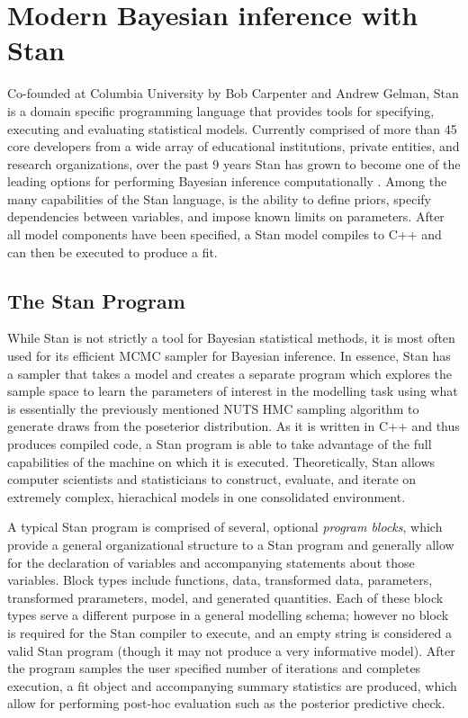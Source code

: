 \documentclass[
  12pt,
]{book}
\theoremstyle{definition}
\theoremstyle{definition}
\theoremstyle{definition}
\theoremstyle{remark}
\begin{document}
\hypertarget{modern-bayesian-inference-with-stan}{%
\chapter{Modern Bayesian inference with Stan}\label{modern-bayesian-inference-with-stan}}

Co-founded at Columbia University by Bob Carpenter and Andrew Gelman, Stan is a domain specific programming language that provides tools for specifying, executing and evaluating statistical models.
Currently comprised of more than 45 core developers from a wide array of educational institutions, private entities, and research organizations, over the past 9 years Stan has grown to become one of the leading options for performing Bayesian inference computationally \citep{Stan2021}.
Among the many capabilities of the Stan language, is the ability to define priors, specify dependencies between variables, and impose known limits on parameters.
After all model components have been specified, a Stan model compiles to C++ and can then be executed to produce a fit.

\hypertarget{the-stan-program}{%
\section{The Stan Program}\label{the-stan-program}}

While Stan is not strictly a tool for Bayesian statistical methods, it is most often used for its efficient MCMC sampler for Bayesian inference.
In essence, Stan has a sampler that takes a model and creates a separate program which explores the sample space to learn the parameters of interest in the modelling task using what is essentially the previously mentioned NUTS HMC sampling algorithm to generate draws from the poseterior distribution.
As it is written in C++ and thus produces compiled code, a Stan program is able to take advantage of the full capabilities of the machine on which it is executed.
Theoretically, Stan allows computer scientists and statisticians to construct, evaluate, and iterate on extremely complex, hierachical models in one consolidated environment.

A typical Stan program is comprised of several, optional \emph{program blocks}, which provide a general organizational structure to a Stan program and generally allow for the declaration of variables and accompanying statements about those variables.
Block types include functions, data, transformed data, parameters, transformed prarameters, model, and generated quantities.
Each of these block types serve a different purpose in a general modelling schema; however no block is required for the Stan compiler to execute, and an empty string is considered a valid Stan program (though it may not produce a very informative model).
After the program samples the user specified number of iterations and completes execution, a fit object and accompanying summary statistics are produced, which allow for performing post-hoc evaluation such as the posterior predictive check.
\end{document}
